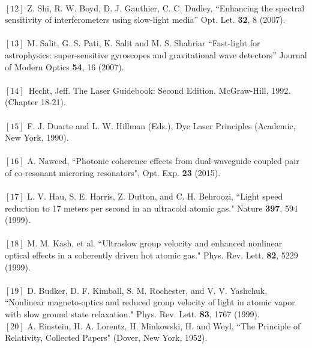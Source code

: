 {\\ $[12]$ Z. Shi, R. W. Boyd, D. J. Gauthier, C. C. Dudley, “Enhancing the spectral sensitivity of interferometers
using slow-light media” Opt. Let. \textbf{32}, 8 (2007).\\
\\ $[13]$  M. Salit, G. S. Pati, K. Salit and M. S. Shahriar “Fast-light for astrophysics: super-sensitive gyroscopes and gravitational wave detectors” Journal of Modern Optics \textbf{54}, 16 (2007).\\
\\ $[14]$\,  Hecht, Jeff. The Laser Guidebook: Second Edition. McGraw-Hill, 1992. (Chapter 18-21).\\
\\ $[15]$  F. J. Duarte and L. W. Hillman (Eds.), Dye Laser Principles (Academic, New York, 1990).\\
\\ $[16]$ A. Naweed, “Photonic coherence effects from dual-waveguide coupled pair of co-resonant microring resonators", Opt. Exp. \textbf{23} (2015).\\
\\ $[17]$ L. V. Hau, S. E. Harris, Z. Dutton, and C. H. Behroozi, “Light speed reduction to 17 meters per second in
an ultracold atomic gas." Nature \textbf{397}, 594 (1999).\\
\\ $[18]$ M. M. Kash, et al. “Ultraslow group velocity and enhanced nonlinear optical effects in a coherently
driven hot atomic gas." Phys. Rev. Lett. \textbf{82}, 5229 (1999).\\
\\ $[19]$ D. Budker, D. F. Kimball, S. M. Rochester, and V. V. Yashchuk, “Nonlinear magneto-optics and reduced group velocity of light in atomic vapor with slow ground state relaxation." Phys. Rev. Lett. \textbf{83}, 1767 (1999).
\\ $[20]$ A. Einstein, H. A. Lorentz, H. Minkowski, H. and Weyl, “The Principle of Relativity, Collected Papers"
(Dover, New York, 1952).}